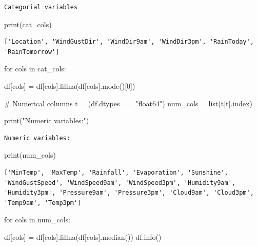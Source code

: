 \documentclass[
  letterpaper,
  DIV=11,
  numbers=noendperiod]{scrartcl}
\newenvironment{Shaded}{\begin{snugshade}}{\end{snugshade}}
\newcommand{\BuiltInTok}[1]{\textcolor[rgb]{0.00,0.23,0.31}{#1}}
\newcommand{\CommentTok}[1]{\textcolor[rgb]{0.37,0.37,0.37}{#1}}
\newcommand{\ControlFlowTok}[1]{\textcolor[rgb]{0.00,0.23,0.31}{#1}}
\newcommand{\DecValTok}[1]{\textcolor[rgb]{0.68,0.00,0.00}{#1}}
\newcommand{\KeywordTok}[1]{\textcolor[rgb]{0.00,0.23,0.31}{#1}}
\newcommand{\NormalTok}[1]{\textcolor[rgb]{0.00,0.23,0.31}{#1}}
\newcommand{\OperatorTok}[1]{\textcolor[rgb]{0.37,0.37,0.37}{#1}}
\newcommand{\StringTok}[1]{\textcolor[rgb]{0.13,0.47,0.30}{#1}}
\begin{document}
\begin{verbatim}
Categorial variables
\end{verbatim}

\begin{Shaded}
\begin{Highlighting}[]
\BuiltInTok{print}\NormalTok{(cat\_cols)}
\end{Highlighting}
\end{Shaded}

\begin{verbatim}
['Location', 'WindGustDir', 'WindDir9am', 'WindDir3pm', 'RainToday', 'RainTomorrow']
\end{verbatim}

\begin{Shaded}
\begin{Highlighting}[]
\ControlFlowTok{for}\NormalTok{ cols }\KeywordTok{in}\NormalTok{ cat\_cols:}
    
\NormalTok{    df[cols] }\OperatorTok{=}\NormalTok{ df[cols].fillna(df[cols].mode()[}\DecValTok{0}\NormalTok{])}

\CommentTok{\# Numerical columns}
\NormalTok{t }\OperatorTok{=}\NormalTok{ (df.dtypes }\OperatorTok{==} \StringTok{"float64"}\NormalTok{)}
\NormalTok{num\_cols }\OperatorTok{=} \BuiltInTok{list}\NormalTok{(t[t].index)}

\BuiltInTok{print}\NormalTok{(}\StringTok{"Numeric variables:"}\NormalTok{)}
\end{Highlighting}
\end{Shaded}

\begin{verbatim}
Numeric variables:
\end{verbatim}

\begin{Shaded}
\begin{Highlighting}[]
\BuiltInTok{print}\NormalTok{(num\_cols)}
\end{Highlighting}
\end{Shaded}

\begin{verbatim}
['MinTemp', 'MaxTemp', 'Rainfall', 'Evaporation', 'Sunshine', 'WindGustSpeed', 'WindSpeed9am', 'WindSpeed3pm', 'Humidity9am', 'Humidity3pm', 'Pressure9am', 'Pressure3pm', 'Cloud9am', 'Cloud3pm', 'Temp9am', 'Temp3pm']
\end{verbatim}

\begin{Shaded}
\begin{Highlighting}[]
\ControlFlowTok{for}\NormalTok{ cols }\KeywordTok{in}\NormalTok{ num\_cols:}
    
\NormalTok{    df[cols] }\OperatorTok{=}\NormalTok{ df[cols].fillna(df[cols].median())}
\NormalTok{df.info()}
\end{Highlighting}
\end{Shaded}
\end{document}
